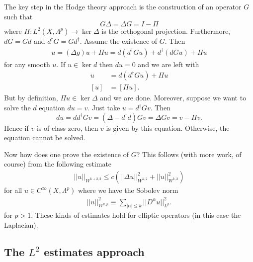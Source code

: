 \documentclass{../mathnotes}
\begin{document}
The key step in the Hodge theory approach is the construction of an operator $G$ such that
\[G\Delta=\Delta G=I-\Pi\]
where $\Pi:L^2(X,\Lambda^p)\to\ker\Delta$ is the orthogonal projection. Furthermore, $dG=Gd$ and $d^\dagger G=Gd^\dagger$.
Assume the existence of $G$. Then
\begin{align*}
    u=(\Delta g)u+\Pi u=d(d^\dagger Gu)+d^\dagger(dGu)+\Pi u
\end{align*}
for any smooth $u$. If $u\in\ker d$ then $du=0$ and we are left with
\begin{align*}
    u&=d(d^\dagger Gu)+\Pi u\\
    [u]&=[\Pi u].
\end{align*}
But by definition, $\Pi u\in\ker\Delta$ and we are done.
Moreover, suppose we want to solve the $d$ equation $du=v$. Just take $u=d^\dagger Gv$. Then
\[du=dd^\dagger Gv=(\Delta-d^\dagger d)Gv=\Delta Gv=v-\Pi v.\]
Hence if $v$ is of class zero, then $v$ is given by this equation. Otherwise, the equation cannot be solved.

Now how does one prove the existence of $G$? This follows (with more work, of course) from the following estimate
\begin{align*}
    ||u||_{W^{k+2,2}}\leq c(||\Delta u||^2_{W^{k,2}}+||u||^2_{W^{k,2}})
\end{align*}
for all $u\in C^\infty(X,\Lambda^p)$ where we have the Sobolev norm
\begin{align*}
    ||u||^2_{W^{k,p}}\equiv \sum_{|\alpha|\leq k}||D^\alpha u||^2_{L^p}.
\end{align*}
for $p>1$. These kinds of estimates hold for elliptic operators (in this case the Laplacian).

\subsection*{The $L^2$ estimates approach}
\end{document}
